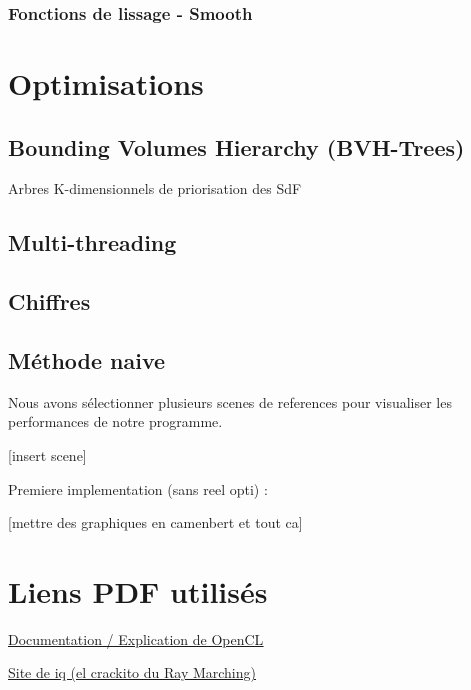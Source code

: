 \documentclass{article}
\begin{document}
\subsubsection{Fonctions de lissage - Smooth}

\section{Optimisations}

\subsection{Bounding Volumes Hierarchy (BVH-Trees)}
Arbres K-dimensionnels de priorisation des SdF

\subsection{Multi-threading}


\subsection{Chiffres}

\subsection{Méthode naive}
Nous avons sélectionner plusieurs scenes de references pour visualiser les performances de notre programme.

[insert scene]

Premiere implementation (sans reel opti) : 

[mettre des graphiques en camenbert et tout ca]

\section{Liens PDF utilisés}

\underline{\href{https://ieeexplore-ieee-org.gorgone.univ-toulouse.fr/document/5457293}{Documentation / Explication de OpenCL}}
\smallskip 

\underline{\href{https://iquilezles.org/}{Site de iq (el crackito du Ray Marching)}}
\end{document}
